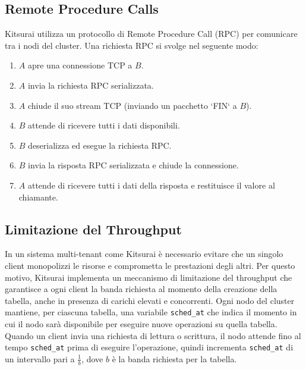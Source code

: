 \subsection{Remote Procedure Calls}
\label{subsec:rpc}

Kitsurai utilizza un protocollo di Remote Procedure Call (RPC) per comunicare tra i nodi del cluster.
Una richiesta RPC si svolge nel seguente modo:
\begin{enumerate}
    \item $A$ apre una connessione TCP a $B$.
    \item $A$ invia la richiesta RPC serializzata.
    \item $A$ chiude il suo stream TCP (inviando un pacchetto `FIN` a $B$).
    \item $B$ attende di ricevere tutti i dati disponibili.
    \item $B$ deserializza ed esegue la richiesta RPC.
    \item $B$ invia la risposta RPC serializzata e chiude la connessione.
    \item $A$ attende di ricevere tutti i dati della risposta e restituisce il valore al chiamante.
\end{enumerate}

\subsection{Limitazione del Throughput}
\label{subsec:limitazione-throughput}

In un sistema multi-tenant come Kitsurai è necessario evitare che un singolo client monopolizzi le risorse e comprometta le prestazioni degli altri.
Per questo motivo, Kitsurai implementa un meccanismo di limitazione del throughput che garantisce a ogni client la banda richiesta al momento della creazione della tabella, anche in presenza di carichi elevati e concorrenti.
Ogni nodo del cluster mantiene, per ciascuna tabella, una variabile \texttt{sched\_at} che indica il momento in cui il nodo sarà disponibile per eseguire nuove operazioni su quella tabella.
Quando un client invia una richiesta di lettura o scrittura, il nodo attende fino al tempo \texttt{sched\_at} prima di eseguire l'operazione, quindi incrementa \texttt{sched\_at} di un intervallo pari a $\frac{1}{b}$, dove $b$ è la banda richiesta per la tabella.

